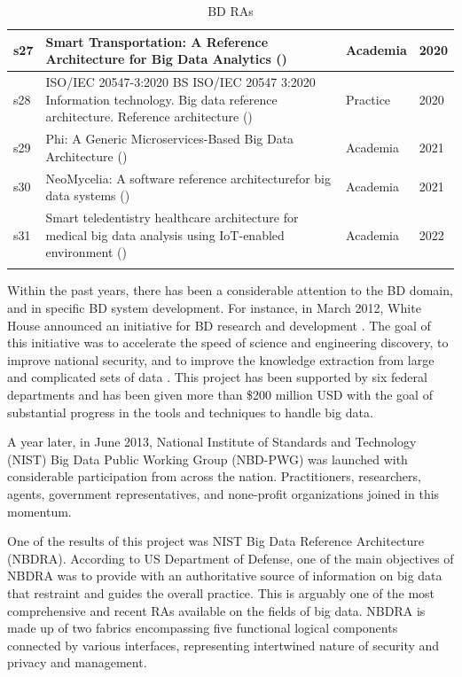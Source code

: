 \documentclass[review]{elsarticle}
\begin{document}
\begin{longtable}{ |p{0.5cm}|p{6.5cm}|p{1.5cm}|p{0.8cm}| }
    \hline
    s27 & Smart Transportation: A Reference Architecture for Big Data Analytics (\cite{castellanos2021smart})  & Academia & 2020   \\
    \hline
    s28 & ISO/IEC 20547-3:2020 BS ISO/IEC 20547 3:2020 Information technology. Big data reference architecture. Reference architecture (\cite{ISO20547}) & Practice  &  2020  \\
    \hline
    s29 & Phi: A Generic Microservices-Based Big Data Architecture (\cite{maamouri2021phi})  & Academia & 2021   \\
    \hline
    s30 & NeoMycelia: A software reference architecturefor big data systems (\cite{AtaeiApsec})  & Academia & 2021   \\
    \hline
    s31 & Smart teledentistry healthcare architecture for medical big data analysis using IoT-enabled environment (\cite{babar2022smart})  & Academia & 2022   \\
    \hline
    \caption{BD RAs}
    \label{table:bdRAs}
\end{longtable}

Within the past years, there has been a considerable attention to the BD domain, and in specific BD system development. For instance, in March 2012, White House announced an initiative for BD research and development \cite{House}. The goal of this initiative was to accelerate the speed of science and engineering discovery, to improve national security, and to improve the knowledge extraction from large and complicated sets of data \cite{chang2015nist}. This project has been supported by six federal departments and has been given more than \$200 million USD with the goal of substantial progress in the tools and techniques to handle big data.

A year later, in June 2013, National Institute of Standards and Technology (NIST) Big Data Public Working Group (NBD-PWG) was launched with considerable participation from across the nation. Practitioners, researchers, agents, government representatives, and none-profit organizations joined in this momentum.

One of the results of this project was NIST Big Data Reference Architecture (NBDRA). According to US Department of Defense, one of the main objectives of NBDRA was to provide with an authoritative source of information on big data that restraint and guides the overall practice. This is arguably one of the most comprehensive and recent RAs available on the fields of big data. NBDRA is made up of two fabrics encompassing five functional logical components connected by various interfaces, representing intertwined nature of security and privacy and management.
\end{document}
